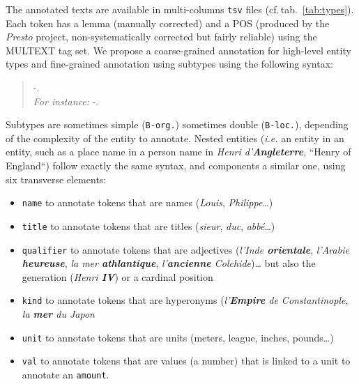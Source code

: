 The annotated texts are available in multi-columns \texttt{tsv} files (cf.\,tab.~\ref{tab:types}). Each token has a lemma (manually corrected) and a POS (produced by the \textit{Presto} project, non-systematically corrected but fairly reliable) using the MULTEXT tag set. We propose a coarse-grained annotation for high-level entity types and fine-grained annotation using subtypes using the following syntax:
\begin{quote}
    \texttt{}-\texttt{}.\texttt{} \\
    \textit{For instance: } \texttt{}-\texttt{}.\texttt{}
\end{quote}

\noindent Subtypes are sometimes simple (\texttt{B-org.}) sometimes double (\texttt{B-loc.}), depending of the complexity of the entity to annotate. Nested entities (\textit{i.e.} an entity in an entity, such as a place name in a person name in \textit{Henri d'\textbf{Angleterre}}, ``Henry of England``) follow exactly the same syntax, and components a similar one, using six transverse elements:

\begin{itemize}
    \item \texttt{name} to annotate tokens that are names (\textit{Louis}, \textit{Philippe}\dots)
    \item \texttt{title}  to annotate tokens that are titles (\textit{sieur}, \textit{duc}, \textit{abbé}\dots)
    \item \texttt{qualifier} to annotate tokens that are adjectives (\textit{l'Inde \textbf{orientale}}, \textit{l'Arabie \textbf{heureuse}}, \textit{la mer \textbf{athlantique}}, \textit{l'\textbf{ancienne} Colchide})… but also the generation (\textit{Henri \textbf{IV}}) or a cardinal position
    \item \texttt{kind} to annotate tokens that are hyperonyms (\textit{l'\textbf{Empire} de Constantinople}, \textit{la \textbf{mer} du Japon}
    \item \texttt{unit} to annotate tokens that are units (meters, league, inches, pounds…)
    \item \texttt{val} to annotate tokens that are values (a number) that is linked to a unit to annotate an \texttt{amount}.
\end{itemize}

